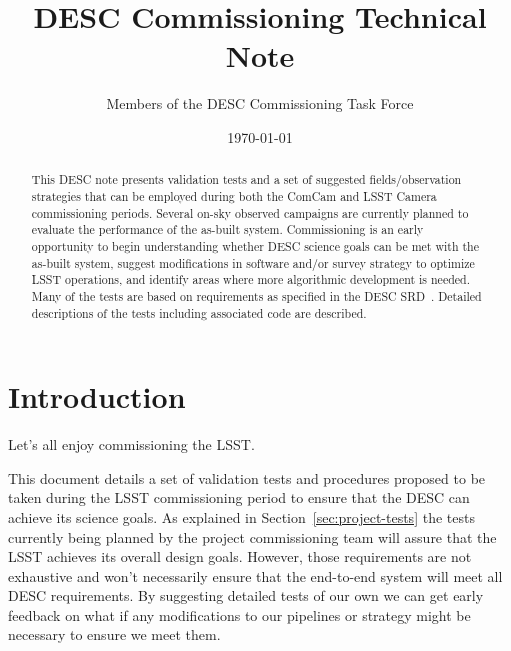 \documentclass[modern]{desc-tex/styles/lsstdescnote}
\begin{document}
\title{DESC Commissioning Technical Note}
\author{Members of the DESC Commissioning Task Force}
\date{\today}

\begin{abstract}

  This DESC note presents validation tests and a set of suggested fields/observation strategies that can be employed during both the ComCam and LSST Camera commissioning periods. Several on-sky observed campaigns are currently planned to evaluate the performance of the as-built system.  Commissioning is an early opportunity to begin understanding whether DESC science goals can be met with the as-built system, suggest modifications in software and/or survey strategy to optimize LSST operations, and identify areas where more algorithmic development is needed.  Many of the tests are based on requirements as specified in the DESC SRD~\cite{DESC-SRD}.  Detailed descriptions of the tests including associated code are described.  
  
 \end{abstract}

\maketitle

\noindent
\begin{center}
  \fboxsep=5pt  
 \end{center} 
\vspace{0.1in}

\section{Introduction}

Let's all enjoy commissioning the LSST.

This document details a set of validation tests and procedures proposed to be taken during the LSST commissioning period to ensure that the DESC can achieve its science goals.  As explained in Section~\ref{sec:project-tests} the tests currently being planned by the project commissioning team will assure that the LSST achieves its overall design goals. However, those requirements are not exhaustive and won't necessarily ensure that the end-to-end system will meet all DESC requirements.  By suggesting detailed tests of our own we can get early feedback on what if any modifications to our pipelines or strategy might be necessary to ensure we meet them.
\end{document}
